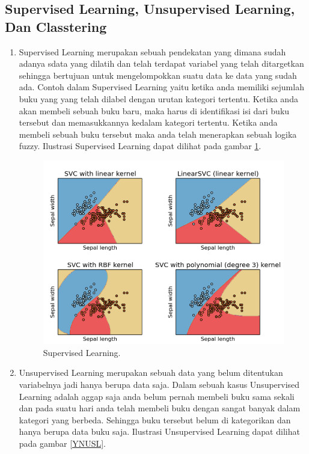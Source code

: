 \subsection{Supervised Learning, Unsupervised Learning, Dan Classtering}
\begin{enumerate}
\item Supervised Learning merupakan sebuah pendekatan yang dimana sudah adanya sdata yang dilatih dan telah terdapat variabel yang telah ditargetkan sehingga bertujuan untuk mengelompokkan suatu data ke data yang sudah ada. Contoh dalam Supervised Learning yaitu ketika anda memiliki sejumlah buku yang yang telah dilabel dengan urutan kategori tertentu. Ketika anda akan membeli sebuah buku baru, maka harus di identifikasi isi dari buku tersebut dan memasukkannya kedalam kategori tertentu. Ketika anda membeli sebuah buku tersebut maka anda telah menerapkan sebuah logika fuzzy. Ilustrasi Supervised Learning dapat dilihat pada gambar \ref{YNSL}.

		\begin{figure}[ht]
		\centerline{\includegraphics[width=1\textwidth]{figures/YN/YN51.png}}
		\caption{Supervised Learning.}
		\label{YNSL}
		\end{figure}

\item Unsupervised Learning merupakan sebuah data yang belum ditentukan variabelnya jadi hanya berupa data saja. Dalam sebuah kasus Unsupervised Learning adalah aggap saja anda belum pernah membeli buku sama sekali dan pada suatu hari anda telah membeli buku dengan sangat banyak dalam kategori yang berbeda. Sehingga buku tersebut belum di kategorikan dan hanya berupa data buku saja. Ilustrasi Unsupervised Learning dapat dilihat pada gambar \ref{YNUSL}.


\end{enumerate}
